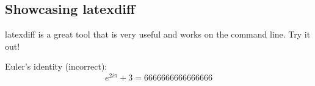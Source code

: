 \documentclass[12pt]{article}
\begin{document}
\begin{flushleft}

\section{Showcasing latexdiff}

latexdiff is a great tool that is very useful and works on the command line. Try it out! \newline

Euler's identity (incorrect):
\begin{equation}
e^{2 i \pi} + 3 = 6666666666666666
\end{equation}



\end{flushleft}
\end{document}
